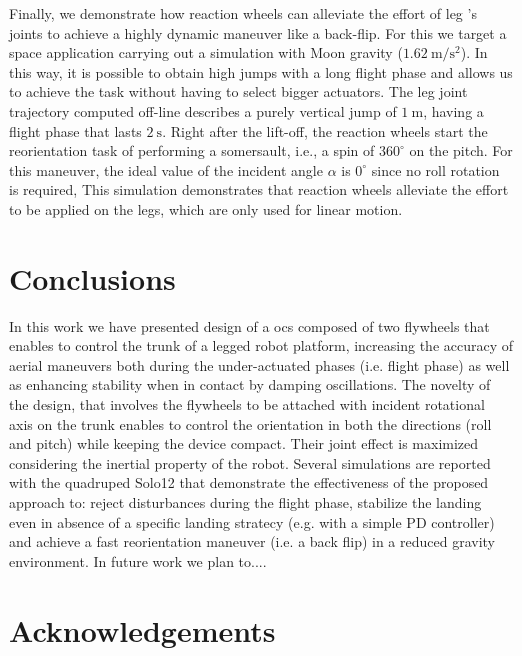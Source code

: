 \documentclass[letterpaper, 10 pt, conference]{ieeeconf}  %
\begin{document}
Finally, we demonstrate how reaction wheels can alleviate the effort of leg 's joints
to achieve a highly dynamic maneuver like a back-flip. 
For this we target a space application carrying out a simulation with Moon gravity ($1.62 \ \mathrm{m/s^2}$).
In this way, it is possible to obtain high jumps with a long flight phase and allows 
us to achieve the task without having to select bigger actuators.  
The leg joint trajectory computed off-line describes a purely vertical jump of $1 \ \mathrm{m}$, having a flight phase that lasts $2 \ \mathrm{s}$.
Right after the lift-off, the reaction wheels start the reorientation task of performing a somersault, i.e., a spin of $360^\circ$ on the pitch.
For this maneuver, the ideal value of the incident angle $\alpha$ is $0^\circ$ since no roll rotation is required, 
This simulation demonstrates that reaction wheels alleviate the effort to be applied on the legs, which are only used for linear motion.


\section{Conclusions}
\label{sec:conclusion}

In this work we have presented design of a  \gls{ocs} composed of two flywheels that enables to control the trunk of a legged robot platform, 
increasing  the accuracy of aerial maneuvers both during the under-actuated phases (i.e. flight phase) as well as 
enhancing stability when in contact by damping oscillations.
The novelty of the design, that involves the flywheels to be attached with incident rotational axis on the trunk  enables to control the orientation
in both the directions (roll and pitch) while keeping the  device compact. Their joint effect is maximized considering the inertial property of the robot. 
Several simulations  are reported with the quadruped Solo12 that demonstrate the effectiveness of the proposed approach to: 
reject disturbances during  the flight phase, stabilize the landing even in absence of a specific landing stratecy (e.g. with a simple PD controller) and 
achieve a fast  reorientation maneuver (i.e. a back flip) in a reduced gravity environment. 
In future work we plan to....


\small
\section*{Acknowledgements}	



\printbibliography
\end{document}
